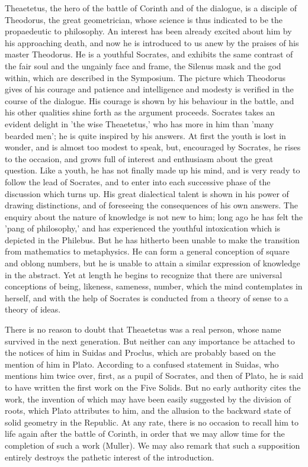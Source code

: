 \documentclass[11pt,letter]{article}
\begin{document}
\par  Theaetetus, the hero of the battle of Corinth and of the dialogue, is a disciple of Theodorus, the great geometrician, whose science is thus indicated to be the propaedeutic to philosophy. An interest has been already excited about him by his approaching death, and now he is introduced to us anew by the praises of his master Theodorus. He is a youthful Socrates, and exhibits the same contrast of the fair soul and the ungainly face and frame, the Silenus mask and the god within, which are described in the Symposium. The picture which Theodorus gives of his courage and patience and intelligence and modesty is verified in the course of the dialogue. His courage is shown by his behaviour in the battle, and his other qualities shine forth as the argument proceeds. Socrates takes an evident delight in 'the wise Theaetetus,' who has more in him than 'many bearded men'; he is quite inspired by his answers. At first the youth is lost in wonder, and is almost too modest to speak, but, encouraged by Socrates, he rises to the occasion, and grows full of interest and enthusiasm about the great question. Like a youth, he has not finally made up his mind, and is very ready to follow the lead of Socrates, and to enter into each successive phase of the discussion which turns up. His great dialectical talent is shown in his power of drawing distinctions, and of foreseeing the consequences of his own answers. The enquiry about the nature of knowledge is not new to him; long ago he has felt the 'pang of philosophy,' and has experienced the youthful intoxication which is depicted in the Philebus. But he has hitherto been unable to make the transition from mathematics to metaphysics. He can form a general conception of square and oblong numbers, but he is unable to attain a similar expression of knowledge in the abstract. Yet at length he begins to recognize that there are universal conceptions of being, likeness, sameness, number, which the mind contemplates in herself, and with the help of Socrates is conducted from a theory of sense to a theory of ideas.

\par  There is no reason to doubt that Theaetetus was a real person, whose name survived in the next generation. But neither can any importance be attached to the notices of him in Suidas and Proclus, which are probably based on the mention of him in Plato. According to a confused statement in Suidas, who mentions him twice over, first, as a pupil of Socrates, and then of Plato, he is said to have written the first work on the Five Solids. But no early authority cites the work, the invention of which may have been easily suggested by the division of roots, which Plato attributes to him, and the allusion to the backward state of solid geometry in the Republic. At any rate, there is no occasion to recall him to life again after the battle of Corinth, in order that we may allow time for the completion of such a work (Muller). We may also remark that such a supposition entirely destroys the pathetic interest of the introduction.
\end{document}
